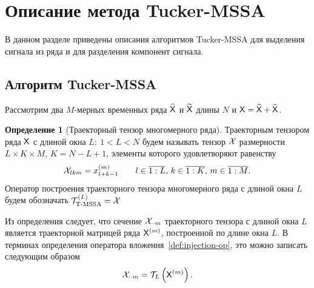 \documentclass[specialist,
  substylefile = spbu.rtx,
subf,href,colorlinks=true, 12pt]{disser}
\theoremstyle{plain}
\theoremstyle{definition}
\newtheorem{definition}{Определение}[section]
\theoremstyle{remark}
\def\tmssa/{Tucker-MSSA}
\begin{document}
\section{Описание метода \tmssa/}
\label{sec:tmssa-desc}
В данном разделе приведены описания алгоритмов \tmssa/ для
выделения сигнала из ряда и для разделения компонент сигнала.

\subsection{Алгоритм \tmssa/}
\label{subsec:tmssa-desc-components}
Рассмотрим два $M$-мерных временных ряда $\widehat{\mathsf{X}}$ и
$\widetilde{\mathsf{X}}$ длины $N$ и $\mathsf{X} = \widehat{\mathsf{X}} + \widetilde{\mathsf{X}}$.

\begin{definition}[Траекторный тензор многомерного ряда]
  \label{def:trajectory-tensor-mssa}
  Траекторным тензором ряда $\mathsf{X}$ с длиной окна $L:\: 1< L < N$ будем
  называть тензор $\mathcal{X}$
  размерности ${L \times K \times M}$, ${K = N - L + 1}$, элементы
  которого удовлетворяют равенству
  \[
    \mathcal{X}_{lkm}=x_{l+k-1}^{(m)} \qquad l \in \overline{1:L},\, k \in
    \overline{1:K},\, m \in \overline{1:M}.
  \]
  Оператор построения траекторного тензора многомерного ряда с длиной
  окна $L$ будем обозначать
  $\mathcal{T}_{\textrm{T-MSSA}}^{(L)} = \mathcal{X}$
\end{definition}
Из определения следует, что сечение $\mathcal{X}_{\cdot \cdot m}$
траекторного тензора с длиной окна $L$
является траекторной матрицей ряда $\mathsf{X}^{(m)}$, построенной по длине окна $L$.
В терминах определения оператора вложения~\ref{def:injection-op},
это можно записать следующим образом
\[
  \mathcal{X}_{\cdot \cdot m} = \mathcal{T}_L \left(\mathsf{X}^{(m)}\right).
\]
\end{document}
